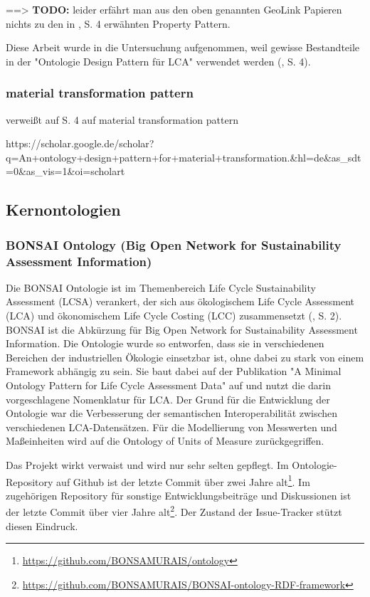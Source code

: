 \documentclass{article}
\begin{document}
==> \textbf{TODO:} leider erfährt man aus den oben genannten GeoLink Papieren nichts zu den in \cite{vardem2015anminimal}, S. 4 erwähnten Property Pattern.

Diese Arbeit wurde in die Untersuchung aufgenommen, weil gewisse Bestandteile in der "Ontologie Design Pattern für LCA" verwendet werden (\cite{vardem2015anminimal}, S. 4).

\subsubsection{material transformation pattern}

\cite{vardem2015anminimal} verweißt auf S. 4 auf material transformation pattern

https://scholar.google.de/scholar?q=An+ontology+design+pattern+for+material+transformation.\&hl=de\&as\_sdt=0\&as\_vis=1\&oi=scholart





\subsection{Kernontologien}

\subsubsection{BONSAI Ontology (Big Open Network for Sustainability Assessment Information)}

Die BONSAI Ontologie ist im Themenbereich Life Cycle Sustainability Assessment (LCSA) verankert, der sich aus ökologischem Life Cycle Assessment (LCA) und ökonomischem Life Cycle Costing (LCC) zusammensetzt (\cite{ghose2022core}, S. 2).
BONSAI ist die Abkürzung für Big Open Network for Sustainability Assessment Information.
Die Ontologie wurde so entworfen, dass sie in verschiedenen Bereichen der industriellen Ökologie einsetzbar ist, ohne dabei zu stark von einem Framework abhängig zu sein.
Sie baut dabei auf der Publikation "A Minimal Ontology Pattern for Life Cycle Assessment Data" \cite{vardem2015anminimal} auf und nutzt die darin vorgeschlagene Nomenklatur für LCA.
Der Grund für die Entwicklung der Ontologie war die Verbesserung der semantischen Interoperabilität zwischen verschiedenen LCA-Datensätzen.
Für die Modellierung von Messwerten und Maßeinheiten wird auf die Ontology of Units of Measure \cite{rijgersberg2013ontology} zurückgegriffen.

Das Projekt wirkt verwaist und wird nur sehr selten gepflegt. Im Ontologie-Repository auf Github ist der letzte Commit über zwei Jahre alt\footnote{\url{https://github.com/BONSAMURAIS/ontology}}. Im zugehörigen Repository für sonstige Entwicklungsbeiträge und Diskussionen ist der letzte Commit über vier Jahre alt\footnote{\url{https://github.com/BONSAMURAIS/BONSAI-ontology-RDF-framework}}. Der Zustand der Issue-Tracker stützt diesen Eindruck.
\end{document}
